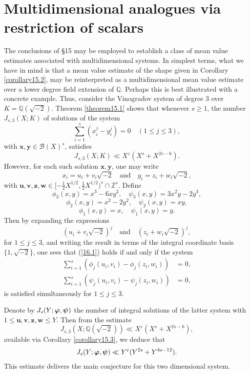 \documentclass[12pt,reqno]{amsart}
\theoremstyle{definition}
\theoremstyle{remark}
\numberwithin{equation}{section}
\def\bfu{{\mathbf u}}
\def\bfv{{\mathbf v}}
\def\bfw{{\mathbf w}}
\def\bfx{{\mathbf x}}
\def\bfy{{\mathbf y}}
\def\bfz{{\mathbf z}}
\def\calB{{\mathcal B}} \def\calBtil{{\widetilde \calB}}
\def\dbZ{{\mathbb Z}}\def\dbQ{{\mathbb Q}}
\def\bfpsi{{\boldsymbol \psi}} \def\bfPsi{{\boldsymbol \Psi}}
\def\eps{\varepsilon}
\def\le{\leqslant} \def\ge{\geqslant} \def\pleq{\preccurlyeq} \def\ple{\prec}
\begin{document}
\section{Multidimensional analogues via restriction of scalars} The 
conclusions of \S15 may be employed to establish a class of mean value estimates 
associated with multidimensional systems. In simplest terms, what we have in mind is that a 
mean value estimate of the shape given in Corollary \ref{corollary15.2}, may be 
reinterpreted as a multidimensional mean value estimate over a lower degree field 
extension of $\dbQ$. Perhaps this is best illustrated with a concrete example. Thus, consider 
the Vinogradov system of degree $3$ over $K=\dbQ(\sqrt{-2})$. Theorem 
\ref{theorem15.1} shows that whenever $s\ge 1$, the number $J_{s,3}(X;K)$ of solutions 
of the system
\begin{equation}\label{16.1}
\sum_{i=1}^s(x_i^j-y_i^j)=0\quad (1\le j\le 3),
\end{equation}
with $\bfx,\bfy\in \calB(X)^s$, satisfies
$$J_{s,3}(X;K)\ll X^\eps(X^s+X^{2s-6}).$$
However, for each such solution $\bfx,\bfy$, one may write
$$x_i=u_i+v_i\sqrt{-2}\quad \text{and}\quad y_i=z_i+w_i\sqrt{-2},$$
with $\bfu,\bfv,\bfz,\bfw\in [-\tfrac{1}{2}X^{1/2},\tfrac{1}{2}X^{1/2})^s\cap \dbZ^s$. 
Define
$$\phi_3(x,y)=x^3-6xy^2,\quad \psi_3(x,y)=3x^2y-2y^3,$$
$$\phi_2(x,y)=x^2-2y^2,\quad \psi_2(x,y)=xy,$$
$$\phi_1(x,y)=x,\quad \psi_1(x,y)=y.$$
Then by expanding the expressions
$$(u_i+v_i\sqrt{-2})^j\quad \text{and}\quad (z_i+w_i\sqrt{-2})^j,$$
for $1\le j\le 3$, and writing the result in terms of the integral coordinate basis 
$\{1,\sqrt{-2}\}$, one sees that (\ref{16.1}) holds if and only if the system
\begin{align*}
\sum_{i=1}^s(\phi_j(u_i,v_i)-\phi_j(z_i,w_i))&=0,\\
\sum_{i=1}^s(\psi_j(u_i,v_i)-\psi_j(z_i,w_i))&=0,
\end{align*}
is satisfied simultaneously for $1\le j\le 3$.\par

Denote by $J_s(Y;\bfvarphi,\bfpsi)$ the number of integral solutions of the latter system 
with $1\le \bfu,\bfv,\bfz,\bfw\le Y$. Then from the estimate
$$J_{s,3}(X;\dbQ(\sqrt{-2}))\ll X^\eps(X^s+X^{2s-6}),$$
available via Corollary \ref{corollary15.3}, we deduce that
$$J_s(Y;\bfvarphi,\bfpsi)\ll Y^\eps (Y^{2s}+Y^{4s-12}).$$
This estimate delivers the main conjecture for this two dimensional system.\par
\end{document}
